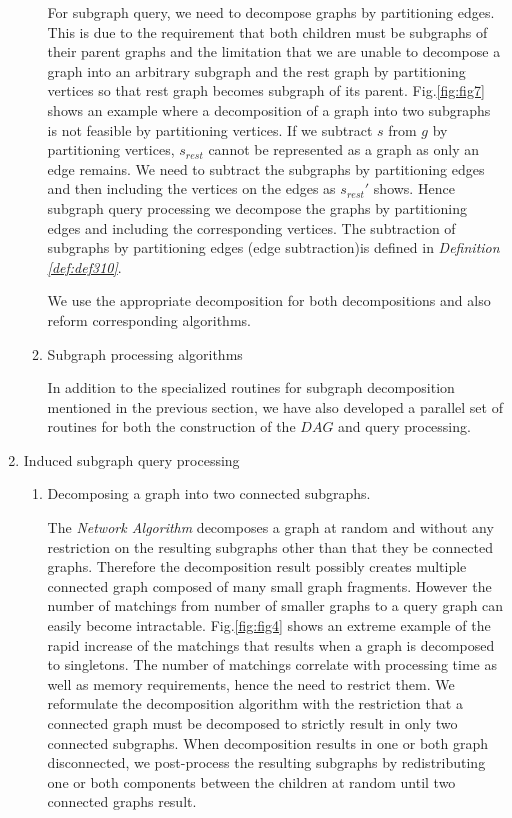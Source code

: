\begin{enumerate}
\begin{enumerate}
For subgraph query, we need to decompose graphs by partitioning edges. 
This is due to the requirement that both children must be subgraphs of their parent graphs
and the limitation that we are unable to decompose a graph into an arbitrary subgraph and the rest graph by partitioning vertices so that rest graph becomes subgraph of its parent.
Fig.\ref{fig:fig7} shows an example where a decomposition of a graph into two subgraphs is not feasible by partitioning vertices.
If we subtract $s$ from $g$ by partitioning vertices, $s_{rest}$ cannot be represented as a graph as only an edge remains. 
We need to subtract the subgraphs by partitioning edges and then including the vertices on the edges as $s_{rest}'$ shows. 
Hence subgraph query processing we decompose the graphs by partitioning edges and including the corresponding vertices.
The subtraction of subgraphs by partitioning edges (edge subtraction)is defined in \textit{Definition \ref{def:def310}}.

We use the appropriate decomposition for both decompositions and also reform corresponding algorithms.

\item Subgraph processing algorithms

In addition to the specialized routines for subgraph decomposition mentioned in the previous section,  we have also developed a parallel set of routines for both the construction of the $DAG$ and query processing. 

\end{enumerate}


\item Induced subgraph query processing

\begin{enumerate}
\item Decomposing a graph into two connected subgraphs.

The \textit{Network Algorithm} decomposes a graph at random and without any restriction on the resulting subgraphs other than that they be connected graphs.
Therefore the decomposition result possibly creates multiple connected graph composed of many small graph fragments.
However the number of matchings from number of smaller graphs to a query graph can easily become intractable.
Fig.\ref{fig:fig4} shows an extreme example of the rapid increase of the matchings that results when a graph is decomposed to singletons.
The number of matchings correlate with processing time as well as memory requirements, hence the need to restrict them. We reformulate the decomposition algorithm with the restriction that a connected graph must be decomposed to strictly result in only two connected subgraphs. When decomposition results in one or both graph disconnected, we post-process the resulting subgraphs by redistributing one or both components between the children  at random until two connected graphs result.


\end{enumerate}
\end{enumerate}
